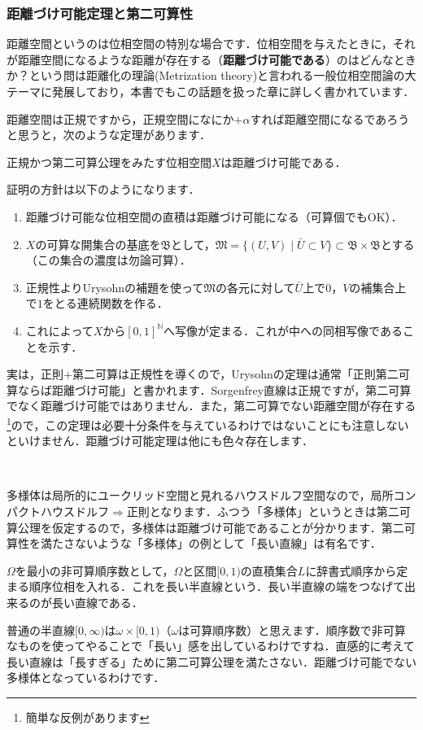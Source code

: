 \subsubsection*{距離づけ可能定理と第二可算性}
距離空間というのは位相空間の特別な場合です．位相空間を与えたときに，それが距離空間になるような距離が存在する（{\bf 距離づけ可能である}）のはどんなときか？という問は距離化の理論(Metrization theory)と言われる一般位相空間論の大テーマに発展しており，本書でもこの話題を扱った章に詳しく書かれています．\par
距離空間は正規ですから，正規空間になにか$+\alpha$すれば距離空間になるであろうと思うと，次のような定理があります．
\begin{thm}[Urysohnの定理]
正規かつ第二可算公理をみたす位相空間$X$は距離づけ可能である．
\end{thm}
証明の方針は以下のようになります．
\begin{enumerate}
\item 距離づけ可能な位相空間の直積は距離づけ可能になる（可算個でもOK）．
\item $X$の可算な開集合の基底を$\mathfrak{B}$として，$\mathfrak{M}=\{(U,V)\mid \bar{U}\subset V \}\subset \mathfrak{B}\times\mathfrak{B}$とする（この集合の濃度は勿論可算）．
\item 正規性よりUrysohnの補題を使って$\mathfrak{M}$の各元に対して$\bar{U}$上で$0$，$V$の補集合上で$1$をとる連続関数を作る．
\item これによって$X$から$[0,1]^\mathbb{N}$へ写像が定まる．これが中への同相写像であることを示す．
\end{enumerate}
実は，正則$+$第二可算は正規性を導くので，Urysohnの定理は通常「正則第二可算ならば距離づけ可能」と書かれます．Sorgenfrey直線は正規ですが，第二可算でなく距離づけ可能ではありません．また，第二可算でない距離空間が存在する\footnote{簡単な反例があります}ので，この定理は必要十分条件を与えているわけではないことにも注意しないといけません．距離づけ可能定理は他にも色々存在します．\par
　\par
多様体は局所的にユークリッド空間と見れるハウスドルフ空間なので，局所コンパクトハウスドルフ$\Rightarrow$正則となります．ふつう「多様体」というときは第二可算公理を仮定するので，多様体は距離づけ可能であることが分かります．第二可算性を満たさないような「多様体」の例として「長い直線」は有名です．
\begin{ex}[長い直線]
$\Omega$を最小の非可算順序数として，$\Omega$と区間$[0,1)$の直積集合$L$に辞書式順序から定まる順序位相を入れる．これを長い半直線という．長い半直線の端をつなげて出来るのが長い直線である．
\end{ex}
普通の半直線$[0,\infty)$は$\omega\times[0,1)$（$\omega$は可算順序数）と思えます．順序数で非可算なものを使ってやることで「長い」感を出しているわけですね．直感的に考えて長い直線は「長すぎる」ために第二可算公理を満たさない．距離づけ可能でない多様体となっているわけです．
